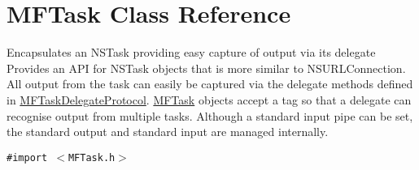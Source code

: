 \hypertarget{interface_m_f_task}{
\section{MFTask Class Reference}
\label{interface_m_f_task}
}
Encapsulates an NSTask providing easy capture of output via its delegate Provides an API for NSTask objects that is more similar to NSURLConnection. All output from the task can easily be captured via the delegate methods defined in \hyperlink{protocol_m_f_task_delegate_protocol-p}{MFTaskDelegateProtocol}. \hyperlink{interface_m_f_task}{MFTask} objects accept a tag so that a delegate can recognise output from multiple tasks. Although a standard input pipe can be set, the standard output and standard input are managed internally.  


{\tt \#import $<$MFTask.h$>$}

